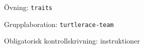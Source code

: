 

\ifkompendium\else

\begin{Slide}{Övning: \texttt{traits}}
\begin{itemize}\SlideFontTiny

\end{itemize}
\end{Slide}

\begin{Slide}{Grupplaboration: \texttt{turtlerace-team}}
\begin{itemize}

\end{itemize}
\end{Slide}

\begin{Slide}{Obligatorisk kontrollskrivning: instruktioner}
\end{Slide}


\fi

